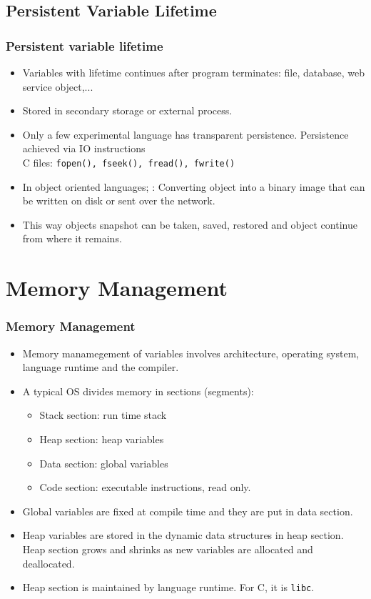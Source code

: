 \subsection{Persistent Variable Lifetime}
\begin{frame}
 \frametitle{Persistent variable lifetime}
\begin{itemize}
 \item Variables with lifetime continues after program terminates: file, database, web service object,...
 \item Stored in secondary storage or external process.
 \item Only a few experimental language has transparent persistence. Persistence achieved via IO instructions\\
C files: \texttt{fopen(), fseek(), fread(), fwrite()}
 \item In object oriented languages; : Converting object into a binary image
that can be written on disk or sent over the network.
 \item This way objects snapshot can be taken, saved, restored and object continue from where it remains.
\end{itemize}
\end{frame}

\section{Memory Management}
\begin{frame}
\frametitle{Memory Management}
\begin{itemize}
\item Memory manamegement of variables involves architecture, operating system, language runtime and the compiler.
\item A typical OS divides memory in sections (segments):
	\begin{itemize}
	\item Stack section: run time stack
	\item Heap section: heap variables
	\item Data section: global variables
	\item Code section: executable instructions, read only.
	\end{itemize}
\item Global variables are fixed at compile time and they are put in data section.
\item Heap variables are stored in the dynamic data structures in heap section. Heap section grows and shrinks as new variables are allocated and deallocated. 
\item Heap section is maintained by language runtime. For C, it is \texttt{libc}.
\end{itemize}
\end{frame}

